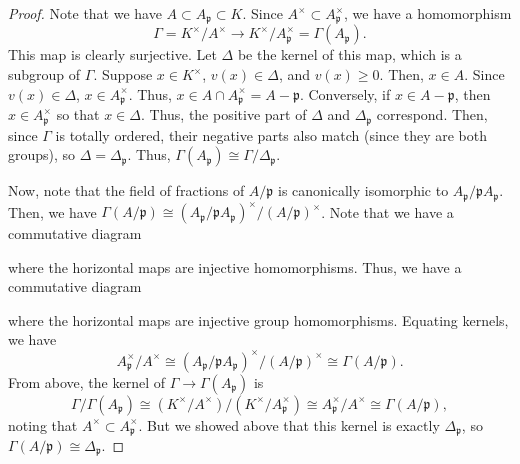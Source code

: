 \begin{proof}
Note that we have $A \subset A_{\mathfrak{p}} \subset K$. Since $A^{\times} \subset A_{\mathfrak{p}}^{\times}$, we have a homomorphism
$$\Gamma = K^{\times}/A^{\times} \to K^{\times}/A_{\mathfrak{p}}^{\times} = \Gamma(A_{\mathfrak{p}}).$$
This map is clearly surjective. Let $\Delta$ be the kernel of this map, which is a subgroup of $\Gamma$. Suppose $x \in K^{\times}$, $v(x) \in \Delta$,
and $v(x) \ge 0$. Then, $x \in A$. Since $v(x) \in \Delta$, $x \in A_{\mathfrak{p}}^{\times}$. Thus, $x \in A \cap A_{\mathfrak{p}}^{\times} = A-\mathfrak{p}$.
Conversely, if $x \in A - \mathfrak{p}$, then $x \in A_{\mathfrak{p}}^{\times}$ so that $x \in \Delta$. Thus, the positive part of $\Delta$ and $\Delta_{\mathfrak{p}}$
correspond. Then, since $\Gamma$ is totally ordered, their negative parts also match (since they are both groups), so $\Delta = \Delta_{\mathfrak{p}}$. Thus,
$\Gamma(A_{\mathfrak{p}}) \cong \Gamma/\Delta_{\mathfrak{p}}$.

Now, note that the field of fractions of $A/\mathfrak{p}$ is canonically isomorphic to $A_{\mathfrak{p}}/\mathfrak{p}A_{\mathfrak{p}}$. Then, we have
$\Gamma(A/\mathfrak{p}) \cong (A_{\mathfrak{p}}/\mathfrak{p}A_{\mathfrak{p}})^{\times}/(A/\mathfrak{p})^{\times}$. Note that we have a commutative diagram
\begin{center}
\end{center}
where the horizontal maps are injective homomorphisms. Thus, we have a commutative diagram
\begin{center}
\end{center}
where the horizontal maps are injective group homomorphisms. Equating kernels, we have
$$A_{\mathfrak{p}}^{\times}/A^{\times} \cong (A_{\mathfrak{p}}/\mathfrak{p}A_{\mathfrak{p}})^{\times} / (A/\mathfrak{p})^{\times} \cong \Gamma(A/\mathfrak{p}).$$
From above, the kernel of $\Gamma \to \Gamma(A_{\mathfrak{p}})$ is
$$\Gamma/\Gamma(A_{\mathfrak{p}}) \cong (K^{\times}/A^{\times})/(K^{\times}/A_{\mathfrak{p}}^{\times}) \cong A_{\mathfrak{p}}^{\times}/A^{\times} \cong \Gamma(A/\mathfrak{p}),$$
noting that $A^{\times} \subset A_{\mathfrak{p}}^{\times}$. But we showed above that this kernel is exactly $\Delta_{\mathfrak{p}}$,
so $\Gamma(A/\mathfrak{p}) \cong \Delta_{\mathfrak{p}}$.
\end{proof}


